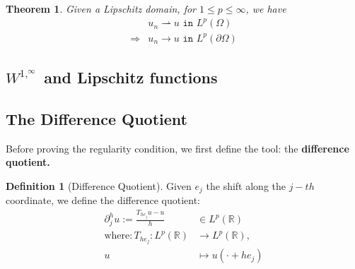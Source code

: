 \documentclass[a4paper,11pt,oneside,fleqn]{book}
\newtheorem{theorem}{Theorem}[section]
\theoremstyle{definition}
\newtheorem{definition}{Definition}[section]
\theoremstyle{remark}
\begin{document}
\begin{theorem}
	Given a Lipschitz domain, for $1 \le p \le \infty$, we have
	\begin{align*}
		&u_n \rightharpoonup u \texttt{ in } L^p(\Omega)\\
		\Rightarrow &u_n \rightarrow u \texttt{ in } L^p(\partial\Omega)
	\end{align*}
\end{theorem}


\subsection{ $W^{1, ^\infty}$ and Lipschitz functions}



\subsection{The Difference Quotient}
Before proving the regularity condition, we first define the tool: the \textbf{difference quotient.}

\begin{definition}[Difference Quotient]
	Given $e_j$ the shift along the $j-th$ coordinate, we define the difference quotient:
	\begin{align*}
		\partial^h_j u := \frac{T_{he_j} u - u}{h} &\in L^p(\mathbb{R})\\
		\text{where}: T_{he_j}: L^p(\mathbb{R}) &\rightarrow L^p(\mathbb{R}), \\
		u &\mapsto u(\cdot + he_j)
	\end{align*}
\end{definition}
\end{document}
